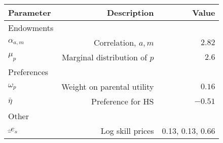 \begin{tabular}{lrr}
\hline
Parameter & Description  & Value  \\
\hline
Endowments &   &   \\
$\alpha_{a,m}$ & Correlation, $a,m$  & $2.82$  \\
$\mu_{p}$ & Marginal distribution of $p$  & $2.6$  \\
Preferences &   &   \\
$\omega_{p}$ & Weight on parental utility  & $0.16$  \\
$\bar{\eta}$ & Preference for HS  & $-0.51$  \\
Other &   &   \\
$\hat_{e}_{s}$ & Log skill prices  & 0.13, 0.13, 0.66  \\
\hline
\end{tabular}%
